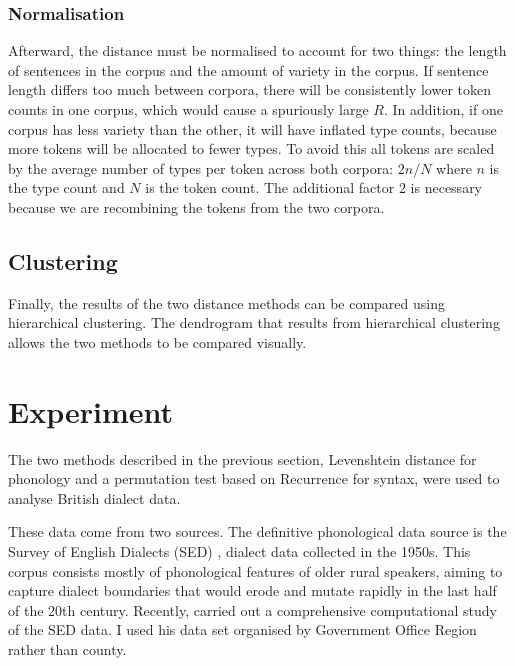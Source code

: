 \documentclass[11pt]{article}
\begin{document}
\subsubsection{Normalisation}
Afterward, the distance must be normalised to account for two things:
the length of sentences in the corpus and the amount of variety in the
corpus. If sentence length differs too much between corpora, there
will be consistently lower token counts in one corpus, which would
cause a spuriously large $R$. In addition, if one corpus has less
variety than the other, it will have inflated type counts, because
more tokens will be allocated to fewer types. To avoid
this all tokens are scaled by the average number of types per token
across both corpora: $2n/N$ where $n$ is the type count and $N$ is
the token count. The additional factor $2$ is necessary because we are
recombining the tokens from the two corpora.

\subsection{Clustering}

Finally, the results of the two distance methods can be compared using
hierarchical clustering. The dendrogram that results from hierarchical
clustering allows the two methods to be compared visually.


\section{Experiment}
The two methods described in the previous section, Levenshtein
distance for phonology and a permutation test based on {\sc
  Recurrence} for syntax, were used to analyse British dialect data.

These data come from two sources. The definitive phonological data
source is the Survey of English Dialects (SED) \cite{orton63}, dialect
data collected in the 1950s. This corpus consists mostly of
phonological features of older rural speakers, aiming to capture
dialect boundaries that would erode and mutate rapidly in the last
half of the 20th century. Recently,  carried
out a comprehensive computational study of the SED data. I used his
data set organised by Government Office Region rather than county.
\end{document}
